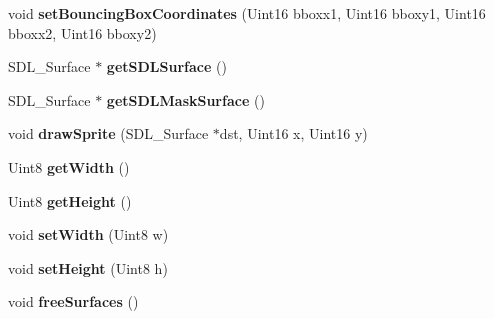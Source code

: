 \begin{DoxyCompactItemize}
\item 
\hypertarget{class_c_sprite_a89cb2b310dcd95fe3ede2a432e669b69}{
void {\bfseries setBouncingBoxCoordinates} (Uint16 bboxx1, Uint16 bboxy1, Uint16 bboxx2, Uint16 bboxy2)}
\label{class_c_sprite_a89cb2b310dcd95fe3ede2a432e669b69}

\item 
\hypertarget{class_c_sprite_a73971af0b90ef6f15021fa222c0bb3d8}{
SDL\_\-Surface $\ast$ {\bfseries getSDLSurface} ()}
\label{class_c_sprite_a73971af0b90ef6f15021fa222c0bb3d8}

\item 
\hypertarget{class_c_sprite_afbb5649a7d7323e24e1c20775f23df22}{
SDL\_\-Surface $\ast$ {\bfseries getSDLMaskSurface} ()}
\label{class_c_sprite_afbb5649a7d7323e24e1c20775f23df22}

\item 
\hypertarget{class_c_sprite_af54dd6825f483f2ec700da3a520cc6c2}{
void {\bfseries drawSprite} (SDL\_\-Surface $\ast$dst, Uint16 x, Uint16 y)}
\label{class_c_sprite_af54dd6825f483f2ec700da3a520cc6c2}

\item 
\hypertarget{class_c_sprite_a0a9c5ebf243f330d0759a35e502b578a}{
Uint8 {\bfseries getWidth} ()}
\label{class_c_sprite_a0a9c5ebf243f330d0759a35e502b578a}

\item 
\hypertarget{class_c_sprite_aa29396ebdc35a463148a797e7db5bbd2}{
Uint8 {\bfseries getHeight} ()}
\label{class_c_sprite_aa29396ebdc35a463148a797e7db5bbd2}

\item 
\hypertarget{class_c_sprite_aab2db49b8a57f0143ee4f156208497d5}{
void {\bfseries setWidth} (Uint8 w)}
\label{class_c_sprite_aab2db49b8a57f0143ee4f156208497d5}

\item 
\hypertarget{class_c_sprite_a642f96d35f8eae79e0d09a2393535cd2}{
void {\bfseries setHeight} (Uint8 h)}
\label{class_c_sprite_a642f96d35f8eae79e0d09a2393535cd2}

\item 
\hypertarget{class_c_sprite_ac6a4ddfa89b63ff7db623ed891ea243b}{
void {\bfseries freeSurfaces} ()}
\label{class_c_sprite_ac6a4ddfa89b63ff7db623ed891ea243b}

\end{DoxyCompactItemize}
